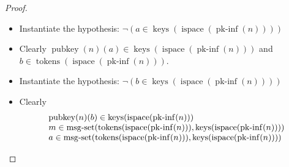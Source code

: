 \documentclass[11pt]{article}
\theoremstyle{plain}
\begin{document}
\begin{proof}
\begin{itemize}[leftmargin=2.8em, itemsep=4pt, parsep=1pt]
\begin{itemize}[leftmargin=2.8em, itemsep=4pt, parsep=1pt]
\begin{equation*}
\begin{array}{@{}l@{}}
m \in \operatorname{tokens}(\operatorname{ispace}(\operatorname{pk\text{-}inf}(n))) \\
r \in \operatorname{tokens}(\operatorname{ispace}(\operatorname{pk\text{-}inf}(n))) \\
\neg (m \in \operatorname{names}(n)) \\
\neg (m \in \operatorname{keys}(\operatorname{ispace}(\operatorname{pk\text{-}inf}(n)))) \\
\begin{array}{@{}l@{}} \operatorname{strand\text{-}map}(\operatorname{ispace}(\operatorname{pk\text{-}inf}(n)))(\operatorname{nth}(2, m)) \\ =\; \langle \langle \mathit{sent}, \operatorname{encr}(\operatorname{lst}(\langle m, a \rangle), \operatorname{pubkey}(n)(b)) \rangle, \langle \mathit{received}, \operatorname{encr}(\operatorname{lst}(\langle m, r, b \rangle), \operatorname{pubkey}(n)(a)) \rangle, \langle \mathit{sent}, \operatorname{encr}(r, \operatorname{pubkey}(n)(b)) \rangle \rangle \end{array} \\
\neg (r \in \operatorname{keys}(\operatorname{ispace}(\operatorname{pk\text{-}inf}(n))))
\end{array}
\end{equation*}
Clearly $a \in \operatorname{tokens}(\operatorname{ispace}(\operatorname{pk\text{-}inf}(n)))$.
  \item[\textbf{342}] Instantiate the hypothesis: $\neg (a \in \operatorname{keys}(\operatorname{ispace}(\operatorname{pk\text{-}inf}(n))))$
  \item[\textbf{343--344}] Clearly $\operatorname{pubkey}(n)(a) \in \operatorname{keys}(\operatorname{ispace}(\operatorname{pk\text{-}inf}(n)))$ and $b \in \operatorname{tokens}(\operatorname{ispace}(\operatorname{pk\text{-}inf}(n)))$.
  \item[\textbf{345}] Instantiate the hypothesis: $\neg (b \in \operatorname{keys}(\operatorname{ispace}(\operatorname{pk\text{-}inf}(n))))$
  \item[\textbf{346--348}] Clearly
\begin{equation*}
\begin{array}{@{}l@{}}
\operatorname{pubkey}(n)(b) \in \operatorname{keys}(\operatorname{ispace}(\operatorname{pk\text{-}inf}(n))) \\
m \in \operatorname{msg\text{-}set}(\operatorname{tokens}(\operatorname{ispace}(\operatorname{pk\text{-}inf}(n))), \operatorname{keys}(\operatorname{ispace}(\operatorname{pk\text{-}inf}(n)))) \\
a \in \operatorname{msg\text{-}set}(\operatorname{tokens}(\operatorname{ispace}(\operatorname{pk\text{-}inf}(n))), \operatorname{keys}(\operatorname{ispace}(\operatorname{pk\text{-}inf}(n))))
\end{array}
\end{equation*}


\end{itemize}
\end{itemize}
\end{proof}
\end{document}
